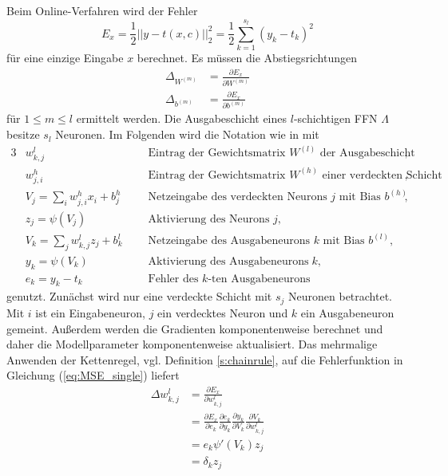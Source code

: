 Beim Online-Verfahren wird der Fehler 
\begin{equation}
    \label{eq:MSE_single}
    E_x= \frac{1}{2} ||y-t(x,c)||_2^2= \frac{1}{2} \sum_{k=1}^{s_l} (y_k-t_k)^2
\end{equation}
für eine einzige Eingabe $x$ berechnet. Es müssen die Abstiegsrichtungen 
\begin{align*}
    \Delta_{W^{(m)}} &= \frac{\partial E_x}{\partial W^{(m)}} \\
    \Delta_{b^{(m)}} &= \frac{\partial E_x}{\partial b^{(m)}} 
\end{align*}
für $1 \leq m \leq l$ ermittelt werden. Die Ausgabeschicht eines $l$-schichtigen FFN $\Lambda$ besitze $s_l$ Neuronen. Im Folgenden wird die Notation wie in \cite{du_diss} mit
\begin{alignat*}{3}
    &w_{k,j}^l  &&\text{Eintrag der Gewichtsmatrix $W^{(l)}$ der Ausgabeschicht}, \\
    &w_{j,i}^h   &&\text{Eintrag der Gewichtsmatrix $W^{(h)}$ einer verdeckten Schicht}, \\
    &V_j=\sum_{i} w_{j,i}^h x_i +b^h_j \; \; \;  &&\text{Netzeingabe des verdeckten Neurons $j$ mit Bias $b^{(h)}$}, \\
    &z_{j}= \psi \left(V_j\right) &&\text{Aktivierung des Neurons $j$},\\
    &V_k=\sum_{j} w_{k,j}^l z_j +b^l_k&&\text{Netzeingabe des Ausgabeneurons $k$ mit Bias $b^{(l)}$}, \\
    &y_k=\psi(V_k) &&\text{Aktivierung des Ausgabeneurons} \; k,\\
    &e_k=y_k-t_k &&\text{Fehler des $k$-ten Ausgabeneurons} 
\end{alignat*}
genutzt. Zunächst wird nur eine verdeckte Schicht mit $s_j$ Neuronen betrachtet. 
Mit $i$ ist ein Eingabeneuron, $j$ ein verdecktes Neuron und $k$ ein Ausgabeneuron gemeint. Außerdem werden die Gradienten komponentenweise berechnet und daher die Modellparameter komponentenweise aktualisiert. Das mehrmalige Anwenden der Kettenregel, vgl. Definition \ref{s:chainrule}, auf die Fehlerfunktion in Gleichung (\ref{eq:MSE_single}) liefert
\begin{align*}
    \label{eq:delta_w_out}
\Delta w_{k,j}^l &= \frac{\partial E_x}{\partial w_{k,j}^l} \\
                 &= \frac{\partial E_x}{\partial e_{k}}
                            \frac{\partial e_k}{\partial y_k} 
                            \frac{\partial y_k}{\partial V_k}
                            \frac{\partial V_k}{\partial w_{k,j}^l}\\
                 &= e_k \psi'(V_k) z_j \\
                 &= \delta_k z_j           
\end{align*} 

